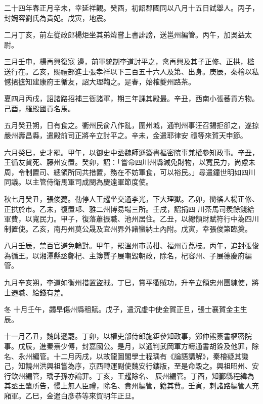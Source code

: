 \begin{pinyinscope}
 二十四年春正月辛未，幸延祥觀。癸酉，初詔郡國同以八月十五日試舉人。丙子，封婉容劉氏為貴妃。戊寅，地震。



 二月丁亥，前左從政郎楊炬坐其弟煒嘗上書誹謗，送邕州編管。丙午，加吳益太尉。



 三月壬申，楊再興復寇
 邊，前軍統制李道討平之，禽再興及其子正修、正拱，檻送行在。乙亥，賜禮部進士張孝祥以下三百五十六人及第、出身。庚辰，秦檜以私憾捃摭知建康府王循友，詔大理鞫之。是春，始榷夔州路茶。



 夏四月丙戌，詔諸路招補三衙諸軍，期三年課其殿最。辛丑，西南小張蕃貢方物。己酉，羅殿國貢名馬。



 五月癸丑朔，日有食之。衢州民俞八作亂，圍州城，通判州事汪召錫拒卻之，遂掠嚴州壽昌縣，遣殿前司正將辛立討平之。辛未，金遣耶律安
 禮等來賀天申節。



 六月癸巳，史才罷。甲午，以御史中丞魏師遜簽書樞密院事兼權參知政事。辛丑，王循友貸死、藤州安置。癸卯，詔：「嘗命四川州縣減免財物，以寬民力，尚慮未周，令制置司、總領所同共措置，務在不妨軍食，可以裕民。」尋遣鐘世明如四川同議。以主管侍衛馬軍司成閔為慶遠軍節度使。



 秋七月癸丑，張俊薨。勒停人王趯坐交通李光，下大理獄。乙卯，臠徭人楊正修、正拱於市。乙未，復置邛、雅二州博易場三所。壬戌，詔捐四
 川茶馬司羨餘錢給軍費，以寬民力。甲子，復落蕭振職、池州居住。乙丑，以總領財賦符行中為四川制置使。乙亥，南丹州莫公晟及宜州界外諸蠻納土內附。戊寅，幸張俊第臨奠。



 八月壬辰，禁百官避免輪對。甲午，罷溫州市黃柑、福州貢荔枝。丙午，追封張俊為循王。以湘潭縣丞鄭杞、主簿賈子展嘲毀朝政，除名，杞容州、子展德慶府編管。



 九月辛亥朔，李道如衡州措置盜賊。丁巳，賞平衢賊功，升辛立領忠州團練使，將士遷職、給錢有差。



 冬
 十月壬午，蠲旱傷州縣租賦。戊子，遣沉虛中使金賀正旦，張士襄賀金主生辰。



 十一月乙丑，魏師遜罷。丁卯，以權吏部侍郎施鉅參知政事，鄭仲熊簽書樞密院事。戊辰，進秦熹少傅，封嘉國公。是月，以通判武岡軍方疇通書胡銓及他罪，除名、永州編管。十二月丙戌，以故龍圖閣學士程瑀有《論語講解》，秦檜疑其譏己，知饒州洪興祖嘗為序，京西轉運副使魏安行鏤版，至是命毀之。興祖昭州、安行欽州編管，瑀子孫亦論罪。丁亥，王趯除名、
 辰州編管。丁酉，知鄞縣程緯為其丞王肇所告，慢上無人臣禮，除名、貴州編管，籍其貲。壬寅，刺諸路編管人充廂軍。乙巳，金遣白彥恭等來賀明年正旦。




\end{pinyinscope}
